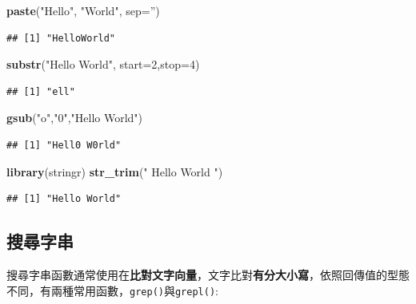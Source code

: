 \documentclass[]{book}
\newenvironment{Shaded}{\begin{snugshade}}{\end{snugshade}}
\newcommand{\KeywordTok}[1]{\textcolor[rgb]{0.13,0.29,0.53}{\textbf{{#1}}}}
\newcommand{\DataTypeTok}[1]{\textcolor[rgb]{0.13,0.29,0.53}{{#1}}}
\newcommand{\DecValTok}[1]{\textcolor[rgb]{0.00,0.00,0.81}{{#1}}}
\newcommand{\StringTok}[1]{\textcolor[rgb]{0.31,0.60,0.02}{{#1}}}
\newcommand{\NormalTok}[1]{{#1}}
\theoremstyle{definition}
\theoremstyle{definition}
\theoremstyle{remark}
\begin{document}
\begin{Shaded}
\begin{Highlighting}[]
\KeywordTok{paste}\NormalTok{(}\StringTok{"Hello"}\NormalTok{, }\StringTok{"World"}\NormalTok{, }\DataTypeTok{sep=}\StringTok{''}\NormalTok{)}
\end{Highlighting}
\end{Shaded}

\begin{verbatim}
## [1] "HelloWorld"
\end{verbatim}

\begin{Shaded}
\begin{Highlighting}[]
\KeywordTok{substr}\NormalTok{(}\StringTok{"Hello World"}\NormalTok{, }\DataTypeTok{start=}\DecValTok{2}\NormalTok{,}\DataTypeTok{stop=}\DecValTok{4}\NormalTok{)}
\end{Highlighting}
\end{Shaded}

\begin{verbatim}
## [1] "ell"
\end{verbatim}

\begin{Shaded}
\begin{Highlighting}[]
\KeywordTok{gsub}\NormalTok{(}\StringTok{"o"}\NormalTok{,}\StringTok{"0"}\NormalTok{,}\StringTok{"Hello World"}\NormalTok{)}
\end{Highlighting}
\end{Shaded}

\begin{verbatim}
## [1] "Hell0 W0rld"
\end{verbatim}

\begin{Shaded}
\begin{Highlighting}[]
\KeywordTok{library}\NormalTok{(stringr)}
\KeywordTok{str_trim}\NormalTok{(}\StringTok{" Hello World "}\NormalTok{)}
\end{Highlighting}
\end{Shaded}

\begin{verbatim}
## [1] "Hello World"
\end{verbatim}

\subsection{搜尋字串}

搜尋字串函數通常使用在\textbf{比對文字向量}，文字比對\textbf{有分大小寫}，依照回傳值的型態不同，有兩種常用函數，\texttt{grep()}與\texttt{grepl()}:
\end{document}
